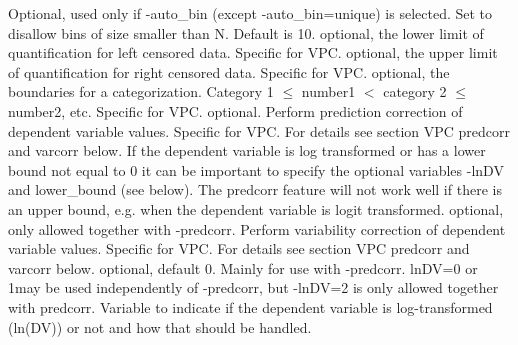 \begin{optionlist}
Optional, used only if -auto\_bin (except -auto\_bin=unique) is selected. Set to disallow bins of size smaller than N. Default is 10. 
\nextopt
{}
optional, the lower limit of quantification for left censored data. Specific for VPC. 
\nextopt
{}
optional, the upper limit of quantification for right censored data. Specific for VPC. 
\nextopt
{}
optional, the boundaries for a categorization. Category 1 $\leq$ number1 $<$ category 2 $\leq$ number2, etc. Specific for VPC. 
\nextopt
{}
optional. Perform prediction correction of dependent variable values. Specific for VPC. For details see section VPC predcorr and varcorr below. If the dependent variable is log transformed or has a lower bound not equal to 0 it can be important to specify the optional variables -lnDV and lower\_bound (see below). The predcorr feature will not work well if there is an upper bound, e.g. when the dependent variable is logit transformed. 
\nextopt
{}
optional, only allowed together with -predcorr. Perform variability correction of dependent variable values. Specific for VPC. For details see section VPC predcorr and varcorr below. 
\nextopt
{}
optional, default 0. Mainly for use with -predcorr. lnDV=0 or 1may be used independently of -predcorr, but -lnDV=2 is only allowed together with predcorr. Variable to indicate if the dependent variable is log-transformed (ln(DV)) or not and how that should be handled.


\end{optionlist}
